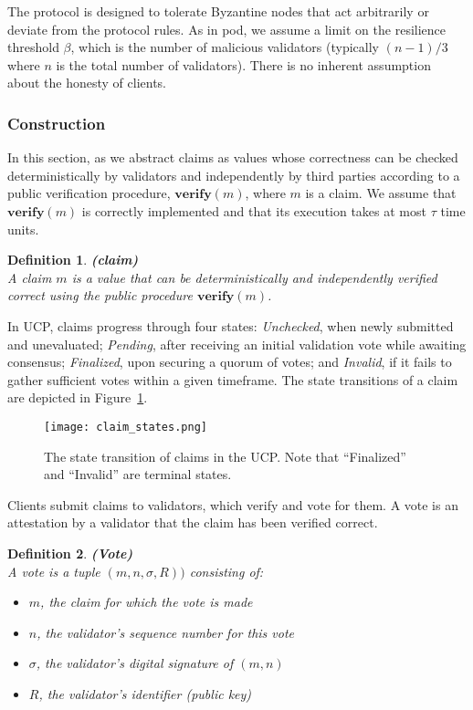 \documentclass{article}
\newtheorem{definition}{Definition}
\newcommand{\UC}{UCP}
\begin{document}
The protocol is designed to tolerate Byzantine nodes that act arbitrarily or deviate from the protocol rules. As in pod, we assume a limit on the resilience threshold $\beta$, which is the number of malicious validators (typically $(n-1)/3$ where $n$ is the total number of validators). There is no inherent assumption about the honesty of clients.


\subsubsection{Construction}

In this section, as we abstract claims as values whose correctness can be checked deterministically by validators and independently by third parties according to a public verification procedure, $\textbf{verify}(m)$, where $m$ is a claim. We assume that $\textbf{verify}(m)$ is correctly implemented and that its execution takes at most $\tau$ time units.

\begin{definition}{\textbf{(claim)}\\}
A claim $m$ is a value that can be deterministically and independently verified correct using the public procedure $\textbf{verify}(m)$.
\end{definition}

In \UC{}, claims progress through four states: \textit{Unchecked}, when newly submitted and unevaluated; \textit{Pending}, after receiving an initial validation vote while awaiting consensus; \textit{Finalized}, upon securing a quorum of votes; and \textit{Invalid}, if it fails to gather sufficient votes within a given timeframe. The state transitions of a claim are depicted in Figure~\ref{fig:uc_claim_states}.

\begin{figure}
    \centering
    \texttt{[image: claim\_states.png]}
    \caption{The state transition of claims in the \UC{}. Note that ``Finalized'' and ``Invalid'' are terminal states.}
    \label{fig:uc_claim_states}
\end{figure}

Clients submit claims to validators, which verify and vote for them. A vote is an attestation by a validator that the claim has been verified correct.
\begin{definition}{\textbf{(Vote)}\\}
A vote is a tuple $(m, n, \sigma, R))$ consisting of:
\begin{itemize}
    \item $m$, the claim for which the vote is made
    \item $n$, the validator's sequence number for this vote
    \item $\sigma$, the validator's digital signature of $(m, n)$
    \item $R$, the validator's identifier (public key)
\end{itemize}
\end{definition}
\end{document}
